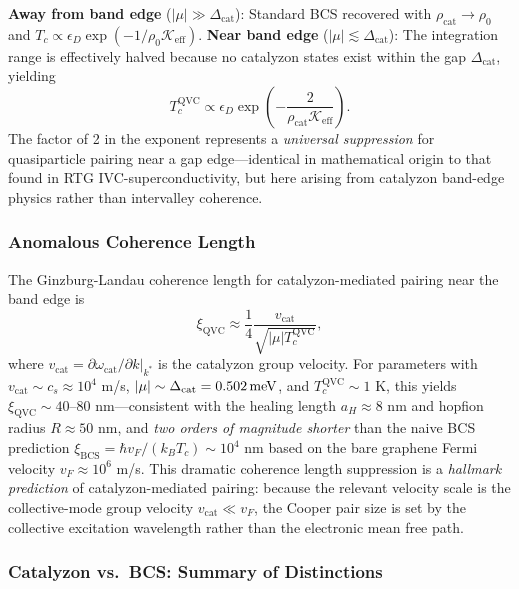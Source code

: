 \documentclass[11pt,letterpaper]{article}
\begin{document}
\textbf{Away from band edge} ($|\mu| \gg \Delta_{\text{cat}}$): Standard BCS recovered with $\rho_{\text{cat}} \to \rho_0$ and $T_c \propto \epsilon_D \exp(-1/\rho_0 \mathcal{K}_{\text{eff}})$.
\textbf{Near band edge} ($|\mu| \lesssim \Delta_{\text{cat}}$): The integration range is effectively halved because no catalyzon states exist within the gap $\Delta_{\text{cat}}$, yielding
\begin{equation}
\boxed{T_c^{\text{QVC}} \propto \epsilon_D \exp\left( -\frac{2}{\rho_{\text{cat}} \mathcal{K}_{\text{eff}}} \right).}
\label{eq:Tc_QVC}
\end{equation}
The factor of 2 in the exponent represents a \textit{universal suppression} for quasiparticle pairing near a gap edge---identical in mathematical origin to that found in RTG IVC-superconductivity\cite{Chau2024}, but here arising from catalyzon band-edge physics rather than intervalley coherence.

\subsubsection{Anomalous Coherence Length}

The Ginzburg-Landau coherence length for catalyzon-mediated pairing near the band edge is
\begin{equation}
\xi_{\text{QVC}} \approx \frac{1}{4} \frac{v_{\text{cat}}}{\sqrt{|\mu| T_c^{\text{QVC}}}},
\label{eq:xi_QVC}
\end{equation}
where $v_{\text{cat}} = \partial \omega_{\text{cat}}/\partial k |_{k^*}$ is the catalyzon group velocity. For \MATBG{} parameters with $v_{\text{cat}} \sim c_s \approx 10^4$ m/s, $|\mu| \sim \Delta_{\text{cat}} =0.502\,\mathrm{meV}$, and $T_c^{\text{QVC}} \sim 1$ K, this yields $\xi_{\text{QVC}} \sim 40$--80 nm---consistent with the healing length $a_H \approx 8$ nm and hopfion radius $R \approx 50$ nm, and \textit{two orders of magnitude shorter} than the naive BCS prediction $\xi_{\text{BCS}} = \hbar v_F / (k_B T_c) \sim 10^4$ nm based on the bare graphene Fermi velocity $v_F \approx 10^6$ m/s.
This dramatic coherence length suppression is a \textit{hallmark prediction} of catalyzon-mediated pairing: because the relevant velocity scale is the collective-mode group velocity $v_{\text{cat}} \ll v_F$, the Cooper pair size is set by the collective excitation wavelength rather than the electronic mean free path.

\subsubsection{Catalyzon vs.\ BCS: Summary of Distinctions}
\end{document}
